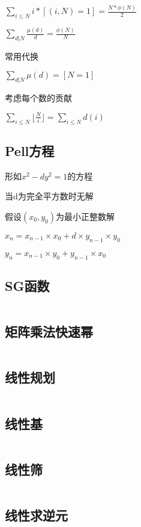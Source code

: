 \documentclass[UTF8]{ctexart}
\begin{document}
$\sum_{i\leq N}i*[(i,N)=1]=\frac{N*\phi(N)}{2}$\par

$\sum_{d|N}\frac{\mu(d)}{d}=\frac{\phi(N)}{N}$\par

常用代换\par

$\sum_{d|N}\mu(d)=[N=1]$\par

考虑每个数的贡献\par

$\sum_{i\leq N}\lfloor \frac{N}{i}\rfloor=\sum_{i\leq N}d(i)$\par

\subsection{Pell方程}

形如$x^2-dy^2=1$的方程\par

当d为完全平方数时无解\par

假设$(x_0,y_0)$为最小正整数解\par

$x_n = x_{n-1} \times x_0 + d \times y_{n-1} \times y_0$\par

$y_n = x_{n-1} \times y_0 + y_{n-1} \times x_0$

\subsection{SG函数}
\inputminted{cpp}{math/SG函数.cpp}
\subsection{矩阵乘法快速幂}
\inputminted{cpp}{math/矩阵乘法快速幂.cpp}
\subsection{线性规划}
\inputminted{cpp}{math/线性规划.cpp}
\subsection{线性基}
\inputminted{cpp}{math/线性基.cpp}
\subsection{线性筛}
\inputminted{cpp}{math/线性筛.cpp}
\subsection{线性求逆元}
\inputminted{cpp}{math/线性求逆元.cpp}
\end{document}

